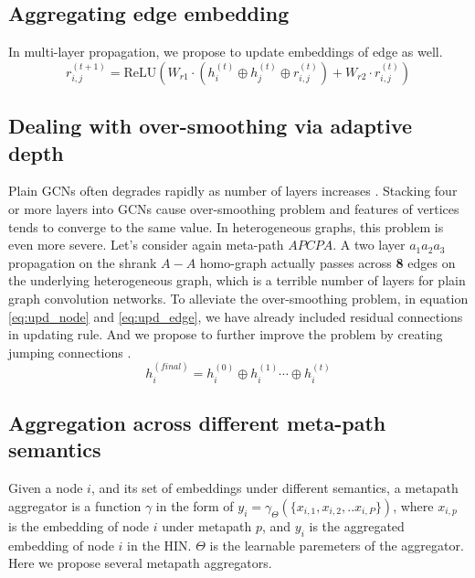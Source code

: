 \subsection{Aggregating edge embedding}
 In multi-layer propagation, we propose to update embeddings of edge as well.
\begin{equation}
\label{eq:upd_edge}
r^{(t+1)}_{i,j} = \text{ReLU}(W_{r1}\cdot (h^{(t)}_i \oplus h^{(t)}_j \oplus r^{(t)}_{i,j}) + W_{r2}\cdot r^{(t)}_{i,j}) 
\end{equation} 

\subsection{Dealing with over-smoothing via adaptive depth}
Plain GCNs often degrades rapidly as number of layers increases \cite{LiHW18,abs-1904-03751}. Stacking four or more layers into GCNs cause over-smoothing problem and features of vertices tends to converge to the same value. In heterogeneous graphs, this problem is even more severe. Let's consider again meta-path $APCPA$. A two layer $a_1 a_2 a_3$ propagation on the shrank $A-A$ homo-graph actually passes across \textbf{8} edges on the underlying heterogeneous graph, which is a terrible number of layers for plain graph convolution networks.
To alleviate the over-smoothing problem, in equation \ref{eq:upd_node} and \ref{eq:upd_edge}, we have already included residual connections \cite{HeZRS16} in updating rule. And we propose to further improve the problem by creating jumping connections \cite{XuLTSKJ18}.
\begin{equation}
\label{eq:jump}
h^{(final)}_i = h^{(0)}_i \oplus h^{(1)}_i \cdots \oplus h^{(t)}_i
\end{equation} 

\subsection{Aggregation across different meta-path semantics}
Given a node $i$, and its set of embeddings under different semantics, a metapath aggregator is a function $\gamma$ in the form of $y_i = \gamma_\Theta(\{x_{i,1},x_{i,2},..x_{i,P}\})$, where $x_{i,p}$ is the embedding of node $i$ under metapath $p$, and $y_i$ is the aggregated embedding of node $i$ in the HIN. $\Theta$ is the learnable paremeters of the aggregator.
Here we propose several metapath aggregators. 

